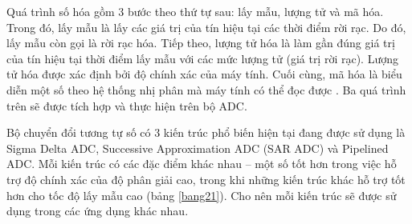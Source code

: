 Quá trình số hóa gồm 3 bước theo thứ tự sau: lấy mẫu, lượng tử và mã hóa. Trong đó, lấy mẫu là lấy các giá trị của tín hiệu tại các thời điểm rời rạc. Do đó, lấy mẫu còn gọi là rời rạc hóa. Tiếp theo, lượng tử hóa là làm gần đúng giá trị của tín hiệu tại thời điểm lấy mẫu với các mức lượng tử (giá trị rời rạc). Lượng tử hóa được xác định bởi độ chính xác của máy tính. Cuối cùng, mã hóa là biểu diễn một số theo hệ thống nhị phân mà máy tính có thể đọc được \cite{xulytinhieusobook}. Ba quá trình trên sẽ được tích hợp và thực hiện trên bộ ADC.

Bộ chuyển đổi tương tự số có 3 kiến trúc phổ biến hiện tại đang được sử dụng là 
Sigma Delta ADC, Successive Approximation ADC (SAR ADC) và Pipelined ADC.
Mỗi kiến trúc có các đặc điểm khác nhau – một số tốt hơn trong việc hỗ trợ độ chính xác của độ phân giải cao, trong khi những kiến trúc khác hỗ trợ tốt hơn cho tốc độ lấy mẫu cao (bảng \ref{bang21}). Cho nên mỗi kiến trúc sẽ được sử dụng trong các ứng dụng khác nhau.
